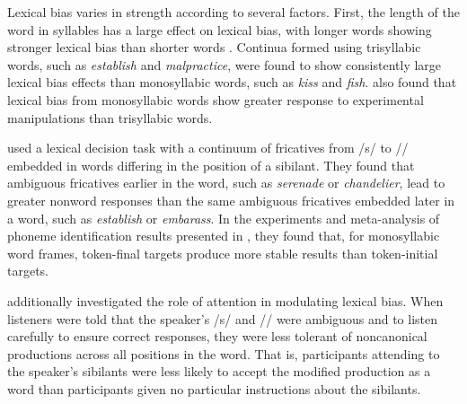 Lexical bias varies in strength according to several factors.  First, the length of the word in syllables has a large effect on lexical bias, with longer words showing stronger lexical bias than shorter words \citep{Pitt2006}.  Continua formed using trisyllabic words, such as \emph{establish} and \emph{malpractice}, were found to show consistently large lexical bias effects than monosyllabic words, such as \emph{kiss} and \emph{fish}.  \citet{Pitt2006} also found that lexical bias from monosyllabic words show greater response to experimental manipulations than trisyllabic words.

\citet{Pitt2012} used a lexical decision task with a continuum of fricatives from /s/ to /\textesh/ embedded in words differing in the position of a sibilant.  They found that ambiguous fricatives earlier in the word, such as \emph{serenade} or \emph{chandelier}, lead to greater nonword responses than the same ambiguous fricatives embedded later in a word, such as \emph{establish} or \emph{embarass}.  In the experiments and meta-analysis of phoneme identification results presented in \citet{Pitt1993}, they found that, for monosyllabic word frames, token-final targets produce more stable results than token-initial targets.

\citet{Pitt2012} additionally investigated the role of attention in modulating lexical bias.  When listeners were told that the speaker's /s/ and /\textesh/ were ambiguous and to listen carefully to ensure correct responses, they were less tolerant of noncanonical productions across all positions in the word.  That is, participants attending to the speaker's sibilants were less likely to accept the modified production as a word than participants given no particular instructions about the sibilants.

